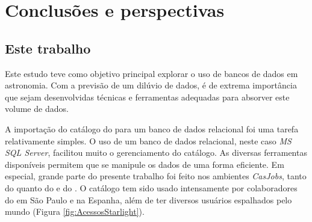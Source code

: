 


\chapter{Conclusões e perspectivas}
\label{sec:conclusao}



\section{Este trabalho}

Este estudo teve como objetivo principal explorar o uso de bancos de dados em
astronomia. Com a previsão de um dilúvio de dados, é de extrema importância que
sejam desenvolvidas técnicas e ferramentas adequadas para absorver este volume
de dados.

A importação do catálogo do \starlight para um banco de dados relacional foi uma
tarefa relativamente simples. O uso de um banco de dados relacional, neste caso
{\em MS SQL Server}, facilitou muito o gerenciamento do catálogo. As diversas
ferramentas disponíveis permitem que se manipule os dados de uma forma
eficiente. Em especial, grande parte do presente trabalho foi feito nos
ambientes {\em CasJobs}, tanto do \starlight quanto do \SDSS e do \galex. O
catálogo tem sido usado intensamente por colaboradores do \starlight em São
Paulo e na Espanha, além de ter diversos usuários espalhados pelo mundo (Figura
\ref{fig:AcessosStarlight}).

